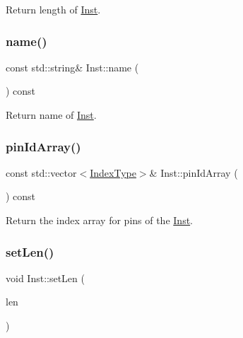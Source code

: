 Return length of \hyperlink{classInst}{Inst}. 

\mbox{\label{classInst_af2eca464fb81066a6f9878ae24a8292a}} 
\subsubsection{\texorpdfstring{name()}{name()}}
{\footnotesize\ttfamily const std\+::string\& Inst\+::name (\begin{DoxyParamCaption}{ }\end{DoxyParamCaption}) const\hspace{0.3cm}{\ttfamily [inline]}}

Return name of \hyperlink{classInst}{Inst}. \mbox{\label{classInst_ab63305e9b98c220c6c09b8d69a8c8a71}} 
\subsubsection{\texorpdfstring{pin\+Id\+Array()}{pinIdArray()}}
{\footnotesize\ttfamily const std\+::vector$<$\hyperlink{type_8h_a581e8093e28e7362f2b6937296190676}{Index\+Type}$>$\& Inst\+::pin\+Id\+Array (\begin{DoxyParamCaption}{ }\end{DoxyParamCaption}) const\hspace{0.3cm}{\ttfamily [inline]}}



Return the index array for pins of the \hyperlink{classInst}{Inst}. 

\mbox{\label{classInst_a63908bff80f6af5034e6d51e894a54e2}} 
\subsubsection{\texorpdfstring{set\+Len()}{setLen()}}
{\footnotesize\ttfamily void Inst\+::set\+Len (\begin{DoxyParamCaption}\item[{\hyperlink{type_8h_a51898ad9e46b1265f3fab67f7d4b04a2}{Real\+Type}}]{len }\end{DoxyParamCaption})\hspace{0.3cm}{\ttfamily [inline]}}




